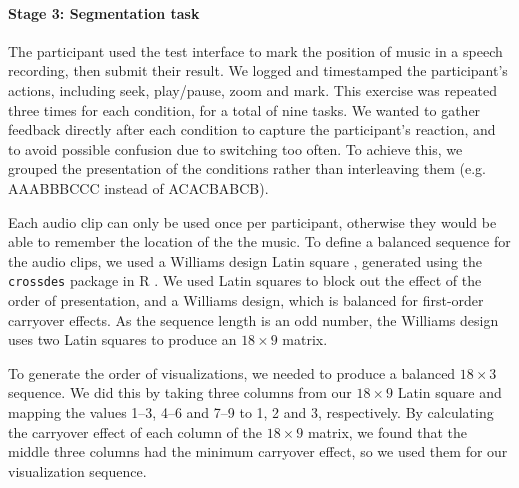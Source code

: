 \paragraph{Stage 3: Segmentation task}
The participant used the test interface to mark the position of music in a speech recording, then submit their result.
We logged and timestamped the participant's actions, including seek, play/pause, zoom and mark.  This exercise was
repeated three times for each condition, for a total of nine tasks.  We wanted to gather feedback directly after each
condition to capture the participant's reaction, and to avoid possible confusion due to switching too often.  To
achieve this, we grouped the presentation of the conditions rather than interleaving them (e.g. AAABBBCCC instead of
ACACBABCB).

Each audio clip can only be used once per participant, otherwise they would be able to remember the location of the the
music. To define a balanced sequence for the audio clips, we used a Williams design Latin square \citep{Williams1949},
generated using the \texttt{crossdes} package in R \citep{Sailer2013}. We used Latin squares to block out the effect of
the order of presentation, and a Williams design, which is balanced for first-order carryover effects.  As the sequence
length is an odd number, the Williams design uses two Latin squares to produce an $18\times9$ matrix.

To generate the order of visualizations, we needed to produce a balanced $18\times3$ sequence. We did this by taking
three columns from our $18\times9$ Latin square and mapping the values 1--3, 4--6 and 7--9 to 1, 2 and 3, respectively.
By calculating the carryover effect of each column of the $18\times9$ matrix, we found that the middle three columns
had the minimum carryover effect, so we used them for our visualization sequence.

